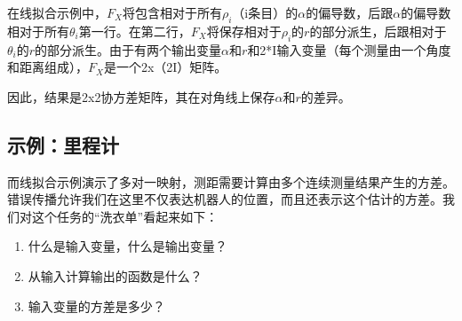 
在线拟合示例中，$F_X$将包含相对于所有$\rho_i$（i条目）的$\alpha$的偏导数，后跟$\alpha$的偏导数相对于所有$\theta_i$第一行。在第二行，$F_X$将保存相对于$\rho_i$的$r$的部分派生，后跟相对于$\theta_i$的$r$的部分派生。由于有两个输出变量$\alpha$和$r$和2*I输入变量（每个测量由一个角度和距离组成），$F_X$是一个2x（2I）矩阵。

因此，结果是2x2协方差矩阵，其在对角线上保存$\alpha$和$r$的差异。

\subsection{示例：里程计}


而线拟合示例演示了多对一映射，测距需要计算由多个连续测量结果产生的方差。错误传播允许我们在这里不仅表达机器人的位置，而且还表示这个估计的方差。我们对这个任务的“洗衣单”看起来如下：

\begin{enumerate}

\item 什么是输入变量，什么是输出变量？
\item 从输入计算输出的函数是什么？
\item 输入变量的方差是多少？
\end{enumerate}


